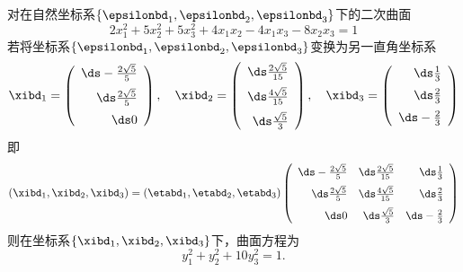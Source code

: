\begin{frame}
  \begin{footnotesize}
    对在自然坐标系$\{\epsilonbd_1,\epsilonbd_2,\epsilonbd_3\}$下的二次曲面
    $$
    2x_1^2+5x_2^2+5x_3^2+4x_1x_2-4x_1x_3-8x_2x_3=1
    $$ \pause
    若将坐标系$\{\epsilonbd_1,\epsilonbd_2,\epsilonbd_3\}$变换为另一直角坐标系
    $$
    \xibd_1=\left(
    \begin{array}{r}
      \ds-\frac{2\sqrt{5}}5\\[0.2cm]
      \ds \frac{2\sqrt{5}}5\\[0.2cm]
      \ds 0
    \end{array}
    \right), \quad
    \xibd_2=\left(
    \begin{array}{r}
      \ds\frac{2\sqrt{5}}{15}\\[0.2cm]
      \ds\frac{4\sqrt{5}}{15}\\[0.2cm]
      \ds\frac{\sqrt{5}}3
    \end{array}
    \right),\quad
    \xibd_3=\left(
    \begin{array}{r}
      \ds\frac13\\[0.2cm]
      \ds\frac23\\[0.2cm]
      \ds-\frac23
    \end{array}
    \right)
    $$\pause
    即
    $$
    (\xibd_1,\xibd_2,\xibd_3)=(\etabd_1,\etabd_2,\etabd_3)\left(
    \begin{array}{rrr}
      \ds-\frac{2\sqrt{5}}5&\ds\frac{2\sqrt{5}}{15}&\ds\frac13\\[0.2cm]
      \ds \frac{2\sqrt{5}}5&\ds\frac{4\sqrt{5}}{15}&\ds\frac23\\[0.2cm]
      \ds 0&\ds\frac{\sqrt{5}}3&\ds-\frac23
    \end{array}
    \right)
    $$\pause
    则在坐标系$\{\xibd_1,\xibd_2,\xibd_3\}$下，曲面方程为
    $$
    y_1^2+y_2^2+10y_3^2=1.
    $$
  \end{footnotesize}
\end{frame}


